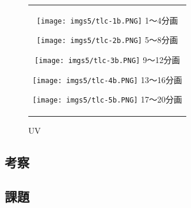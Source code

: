 \documentclass[a4paper,papersize,dvipdfmx]{jsarticle}
\begin{document}
\begin{figure}[htbp]
\begin{center}
\begin{tabular}{c}

\begin{minipage}{0.19\hsize}
\begin{center}
\texttt{[image: imgs5/tlc-1b.PNG]}
\hspace{1.6cm} 1〜4分画
\end{center}
\end{minipage}

\begin{minipage}{0.19\hsize}
\begin{center}
\texttt{[image: imgs5/tlc-2b.PNG]}
\hspace{1.6cm} 5〜8分画
\end{center}
\end{minipage}

\begin{minipage}{0.19\hsize}
\begin{center}
\texttt{[image: imgs5/tlc-3b.PNG]}
\hspace{1.6cm} 9〜12分画
\end{center}
\end{minipage}

\begin{minipage}{0.19\hsize}
\begin{center}
\texttt{[image: imgs5/tlc-4b.PNG]}
\hspace{1.6cm} 13〜16分画
\end{center}
\end{minipage}

\begin{minipage}{0.19\hsize}
\begin{center}
\texttt{[image: imgs5/tlc-5b.PNG]}
\hspace{1.6cm} 17〜20分画
\end{center}
\end{minipage}

\end{tabular}
\caption{UV}
\end{center}
\end{figure}
\subsection*{考察}
\subsection*{課題}
\end{document}
